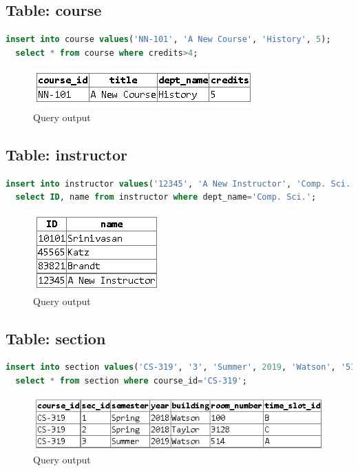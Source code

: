 \documentclass{article}
\begin{document}
\subsection{Table: course}
\begin{lstlisting}[language=sql]
  insert into course values('NN-101', 'A New Course', 'History', 5);
  select * from course where credits>4;
\end{lstlisting}
\begin{figure}[!ht]
  \begin{center}
  \includegraphics[scale=1]{course.png}
  \caption{Query output}
  \end{center}
\end{figure}

\subsection{Table: instructor}
\begin{lstlisting}[language=sql]
  insert into instructor values('12345', 'A New Instructor', 'Comp. Sci.', 50000);
  select ID, name from instructor where dept_name='Comp. Sci.';
\end{lstlisting}
\begin{figure}[!ht]
  \begin{center}
  \includegraphics[scale=0.75]{inst.png}
  \caption{Query output}
  \end{center}
\end{figure}

\newpage
\subsection{Table: section}
\begin{lstlisting}[language=sql]
  insert into section values('CS-319', '3', 'Summer', 2019, 'Watson', '514', 'A');
  select * from section where course_id='CS-319';
\end{lstlisting}
\begin{figure}[!ht]
  \begin{center}
  \includegraphics[scale=1]{sec.png}
  \caption{Query output}
  \end{center}
\end{figure}
\end{document}
